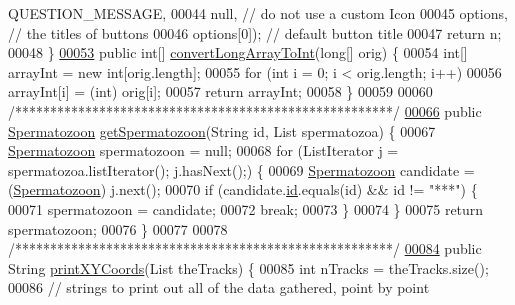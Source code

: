 \begin{DoxyCode}
      QUESTION\_MESSAGE,
00044         null, \textcolor{comment}{// do not use a custom Icon}
00045         options, \textcolor{comment}{// the titles of buttons}
00046         options[0]); \textcolor{comment}{// default button title}
00047     \textcolor{keywordflow}{return} n;
00048   \}
\hypertarget{_utils_8java_source_l00053}{}\hyperlink{classfunctions_1_1_utils_af205010f6a95a6e41a837305446fd262}{00053}   \textcolor{keyword}{public} \textcolor{keywordtype}{int}[] \hyperlink{classfunctions_1_1_utils_af205010f6a95a6e41a837305446fd262}{convertLongArrayToInt}(\textcolor{keywordtype}{long}[] orig) \{
00054     \textcolor{keywordtype}{int}[] arrayInt = \textcolor{keyword}{new} \textcolor{keywordtype}{int}[orig.length];
00055     \textcolor{keywordflow}{for} (\textcolor{keywordtype}{int} i = 0; i < orig.length; i++)
00056       arrayInt[i] = (\textcolor{keywordtype}{int}) orig[i];
00057     \textcolor{keywordflow}{return} arrayInt;
00058   \}
00059 
00060   \textcolor{comment}{/******************************************************/}
\hypertarget{_utils_8java_source_l00066}{}\hyperlink{classfunctions_1_1_utils_a3af2ec0eae0c2c19f7332e34197999bf}{00066}   \textcolor{keyword}{public} \hyperlink{classdata_1_1_spermatozoon}{Spermatozoon} \hyperlink{classfunctions_1_1_utils_a3af2ec0eae0c2c19f7332e34197999bf}{getSpermatozoon}(String \textcolor{keywordtype}{id}, List spermatozoa) \{
00067     \hyperlink{classdata_1_1_spermatozoon}{Spermatozoon} spermatozoon = null;
00068     \textcolor{keywordflow}{for} (ListIterator j = spermatozoa.listIterator(); j.hasNext();) \{
00069       \hyperlink{classdata_1_1_spermatozoon}{Spermatozoon} candidate = (\hyperlink{classdata_1_1_spermatozoon}{Spermatozoon}) j.next();
00070       \textcolor{keywordflow}{if} (candidate.\hyperlink{classdata_1_1_spermatozoon_a76010eef1edc0406cc2375c25d2a433d}{id}.equals(\textcolor{keywordtype}{id}) && \textcolor{keywordtype}{id} != \textcolor{stringliteral}{"***"}) \{
00071         spermatozoon = candidate;
00072         \textcolor{keywordflow}{break};
00073       \}
00074     \}
00075     \textcolor{keywordflow}{return} spermatozoon;
00076   \}
00077 
00078   \textcolor{comment}{/******************************************************/}
\hypertarget{_utils_8java_source_l00084}{}\hyperlink{classfunctions_1_1_utils_ab85218da3569b5a7c0b9749e7b2b747a}{00084}   \textcolor{keyword}{public} String \hyperlink{classfunctions_1_1_utils_ab85218da3569b5a7c0b9749e7b2b747a}{printXYCoords}(List theTracks) \{
00085     \textcolor{keywordtype}{int} nTracks = theTracks.size();
00086     \textcolor{comment}{// strings to print out all of the data gathered, point by point}

\end{DoxyCode}
